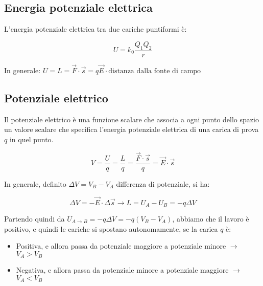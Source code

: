 \subsection{Energia potenziale elettrica}

L'energia potenziale elettrica tra due cariche puntiformi è:

\begin{equation*}
    U = k_0 \frac{Q_1 Q_2}{r}
\end{equation*}


In generale: $U = L = \vec{F} \cdot \vec{s} = q \vec{E} \cdot \text{distanza dalla fonte di campo}$

\subsection{Potenziale elettrico}

Il potenziale elettrico è una funzione scalare che associa a ogni punto dello spazio un valore scalare che specifica l'energia potenziale elettrica di una carica di prova $q$ in quel punto.

\begin{equation*}
    V = \frac{U}{q} = \frac{L}{q} = \frac{\vec{F} \cdot \vec{s}}{q} = \vec{E} \cdot \vec{s}
\end{equation*}

In generale, definito $\Delta V = V_B - V_A$ differenza di potenziale, si ha:

\begin{equation*}
    \Delta V = -\vec{E} \cdot \Delta \vec{s} \rightarrow L = U_A - U_B = - q \Delta V
\end{equation*}

Partendo quindi da $U_{A \rightarrow B} = -q \Delta V = -q (V_B - V_A)$, abbiamo che il lavoro è positivo, e quindi le cariche si spostano autonomamente, se la carica $q$ è:

\begin{itemize}
    \item Positiva, e allora passa da potenziale maggiore a potenziale minore $\rightarrow$ $V_A > V_B$
    \item Negativa, e allora passa da potenziale minore a potenziale maggiore $\rightarrow$ $V_A < V_B$
\end{itemize}


